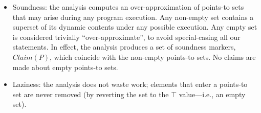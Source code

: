 \begin{itemize}
\item Soundness: the analysis computes an over-approximation of points-to sets that may arise during any program execution. Any non-empty set contains a superset of its dynamic contents under any possible execution. Any empty set is considered trivially ``over-approximate'', to avoid special-casing all our statements. In effect, the analysis produces a set of soundness markers, $Claim(P)$, which coincide with the non-empty points-to sets. No claims are made about empty points-to sets.

\item Laziness: the analysis does not waste work; elements that enter a points-to set are never removed (by reverting the set to the $\top$ value---i.e., an empty set).
\end{itemize}


